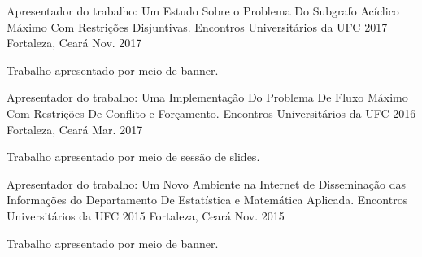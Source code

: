 

\begin{cventries}
  \cventry
    {Apresentador do trabalho: Um Estudo Sobre o Problema Do Subgrafo Acíclico Máximo Com Restrições Disjuntivas.} %
    {Encontros Universitários da UFC 2017} %
    {Fortaleza, Ceará} %
    {Nov. 2017} %
    {
      \begin{cvitems} %
        \item {Trabalho apresentado por meio de banner.}
      \end{cvitems}
    }
    
\vskip 0.2cm        
  \cventry
    {Apresentador do trabalho: Uma Implementação Do Problema De Fluxo Máximo Com Restrições De Conflito e Forçamento.} %
    {Encontros Universitários da UFC 2016} %
    {Fortaleza, Ceará} %
    {Mar. 2017} %
    {
      \begin{cvitems} %
        \item {Trabalho apresentado por meio de sessão de slides.}
      \end{cvitems}
    }
\vskip 0.2cm
  \cventry
    {Apresentador do trabalho: Um Novo Ambiente na Internet de Disseminação
    das Informações do Departamento De Estatística e Matemática Aplicada.} %
    {Encontros Universitários da UFC 2015} %
    {Fortaleza, Ceará} %
    {Nov. 2015} %
    {
      \begin{cvitems} %
        \item {Trabalho apresentado por meio de banner.}
      \end{cvitems}
    }




\end{cventries}
